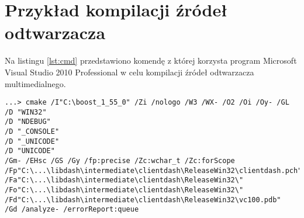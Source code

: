 \chapter{Przykład kompilacji źródeł odtwarzacza}
\label{cha:dodatekB}

Na listingu \ref{lst:cmd} przedstawiono komendę z której korzysta program Microsoft Visual Studio 2010 Professional w celu kompilacji źródeł odtwarzacza multimedialnego.

\begin{lstlisting}[caption=Kompilacja źródeł odtwarzacza przez program MVS 2010., label=lst:cmd]
...> cmake /I"C:\boost_1_55_0" /Zi /nologo /W3 /WX- /O2 /Oi /Oy- /GL
/D "WIN32" 
/D "NDEBUG" 
/D "_CONSOLE" 
/D "_UNICODE" 
/D "UNICODE" 
/Gm- /EHsc /GS /Gy /fp:precise /Zc:wchar_t /Zc:forScope 
/Fp"C:\...\libdash\intermediate\clientdash\ReleaseWin32\clientdash.pch" 
/Fa"C:\...\libdash\intermediate\clientdash\ReleaseWin32\" 
/Fo"C:\...\libdash\intermediate\clientdash\ReleaseWin32\" 
/Fd"C:\...\libdash\intermediate\clientdash\ReleaseWin32\vc100.pdb" 
/Gd /analyze- /errorReport:queue 
\end{lstlisting}
